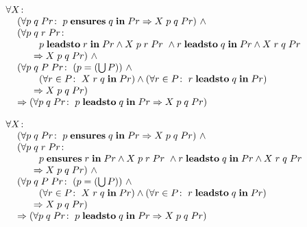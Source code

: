 $\begin{array}{lll}
 \forall X\!:\\
  \cn (\forall p\;q\;Pr\!:\
       p\;{\bf ensures}\;q\;{\bf in}\;Pr \Rightarrow X\;p\;q\;Pr)\ \wedge\\
  \cn (\forall p\;q\;r\;Pr\!:\\
  \cn \hspace{8mm}
       p\;{\bf leadsto}\;r\;{\bf in}\;Pr \wedge X\;p\;r\;Pr\ \wedge
       r\;{\bf leadsto}\;q\;{\bf in}\;Pr \wedge X\;r\;q\;Pr\\
  \cn \hspace{5mm}
      \Rightarrow X\;p\;q\;Pr)\ \wedge\\
  \cn (\forall p\;q\;P\;Pr\!:\
      (p = (\bigcup P))\ \wedge\\
  \cn \hspace{8mm}
      (\forall r \in P\!:\ X\;r\;q\;{\bf in}\;Pr) \wedge
      (\forall r \in P\!:\ r\;{\bf leadsto}\;q\;{\bf in}\;Pr)\\
  \cn \hspace{5mm}
       \Rightarrow X\;p\;q\;Pr)\\
 \ \hspace{3mm} \Rightarrow
     (\forall  p\;q\;Pr\!:\
          p\;{\bf leadsto}\;q\;{\bf in}\;Pr \Rightarrow X\;p\;q\;Pr)\\
\end{array} $

\medskip
$\begin{array}{lll}
 \forall X\!:\\
  \cn (\forall p\;q\;Pr\!:\
       p\;{\bf ensures}\;q\;{\bf in}\;Pr \Rightarrow X\;p\;q\;Pr)\ \wedge\\
  \cn (\forall p\;q\;r\;Pr\!:\\
  \cn \hspace{8mm}
       p\;{\bf ensures}\;r\;{\bf in}\;Pr \wedge X\;p\;r\;Pr\ \wedge
       r\;{\bf leadsto}\;q\;{\bf in}\;Pr \wedge X\;r\;q\;Pr\\
  \cn \hspace{5mm}
      \Rightarrow X\;p\;q\;Pr)\ \wedge\\
  \cn (\forall p\;q\;P\;Pr\!:\
      (p = (\bigcup P))\ \wedge\\
  \cn \hspace{8mm}
      (\forall r \in P\!:\ X\;r\;q\;{\bf in}\;Pr) \wedge
      (\forall r \in P\!:\ r\;{\bf leadsto}\;q\;{\bf in}\;Pr)\\
  \cn \hspace{5mm}
       \Rightarrow X\;p\;q\;Pr)\\
 \ \hspace{3mm} \Rightarrow
     (\forall  p\;q\;Pr\!:\
          p\;{\bf leadsto}\;q\;{\bf in}\;Pr \Rightarrow X\;p\;q\;Pr)\\
\end{array} $

